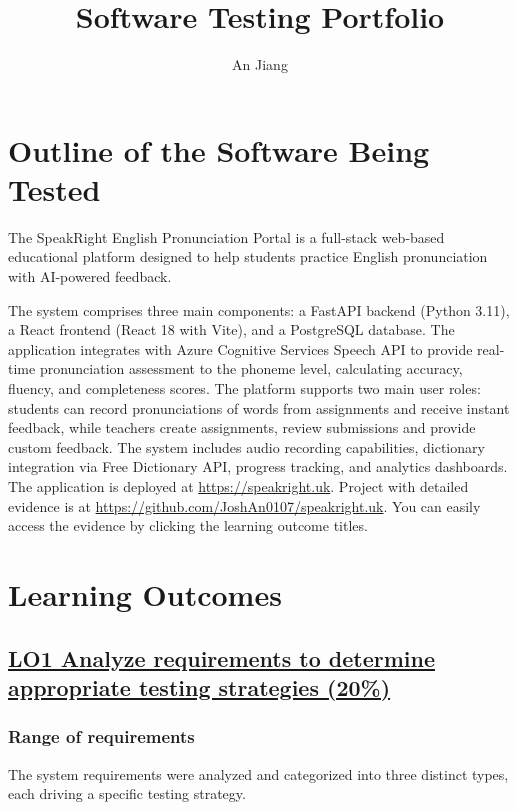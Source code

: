 \documentclass[sigconf]{acmart}
\title{Software Testing Portfolio}
\author{An Jiang}
\affiliation{
  \institution{The University of Edinburgh}
  \country{United Kingdom}
}
\begin{document}
\maketitle

\section{Outline of the Software Being Tested}

The SpeakRight English Pronunciation Portal is a full-stack web-based educational platform designed to help students practice English pronunciation with AI-powered feedback.

The system comprises three main components: a FastAPI backend (Python 3.11), a React frontend (React 18 with Vite), and a PostgreSQL database. The application integrates with Azure Cognitive Services Speech API to provide real-time pronunciation assessment to the phoneme level, calculating accuracy, fluency, and completeness scores. The platform supports two main user roles: students can record pronunciations of words from assignments and receive instant feedback, while teachers create assignments, review submissions and provide custom feedback. The system includes audio recording capabilities, dictionary integration via Free Dictionary API, progress tracking, and analytics dashboards. The application is deployed at \url{https://speakright.uk}. Project with detailed evidence is at \url{https://github.com/JoshAn0107/speakright.uk}. You can easily access the evidence by clicking the learning outcome titles.

\section{Learning Outcomes}

\subsection{\href{https://github.com/JoshAn0107/speakright.uk/blob/main/LO1_COMPLETE.md}{LO1 Analyze requirements to determine appropriate testing strategies (20\%)}}

\subsubsection{Range of requirements}

The system requirements were analyzed and categorized into three distinct types, each driving a specific testing strategy.
\end{document}
